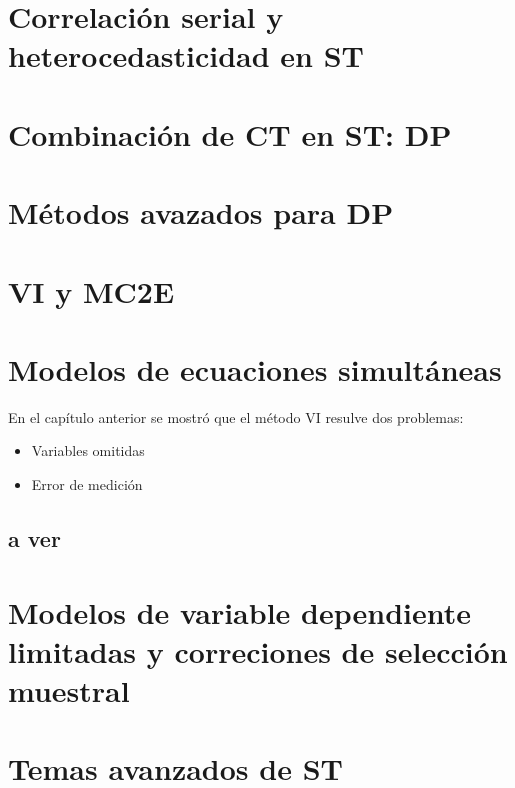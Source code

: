 \documentclass[a4paper,11pt]{book}
\begin{document}
\chapter{Correlación serial y heterocedasticidad en ST}
\chapter{Combinación de CT en ST: DP}
\chapter{Métodos avazados para DP}
\chapter{VI y MC2E}
\chapter{Modelos de ecuaciones simultáneas}
En el capítulo anterior se mostró que el método VI resulve dos problemas:
\begin{itemize}
	\item Variables omitidas
	\item Error de medición
\end{itemize}
\section{a ver}
\chapter{Modelos de variable dependiente limitadas y correciones de selección muestral}
\chapter{Temas avanzados de ST}
\end{document}
